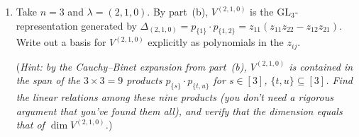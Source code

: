\documentclass[12pt]{article}
\newcommand{\GL}{\mathrm{GL}}
\begin{document}
\begin{enumerate}
\begin{enumerate}
(\emph{Hint: use Cauchy--Binet to show the polynomial $\GL_n$-representation generated by $\Delta_\lambda$ is finite-dimensional, hence completely reducible, and apply Part~6 of the proof sketch of Theorem~57, which you can assume holds equally well for $GL_n$.})

\item Take $n = 3$ and $\lambda = (2,1,0)$. By part~(b), $V^{(2,1,0)}$ is
the $\GL_3$-representation generated by
$\Delta_{(2,1,0)} = p_{\{1\}} \cdot p_{\{1,2\}}= z_{11}(z_{11}z_{22} - z_{12}z_{21})$.
Write out a basis for $V^{(2,1,0)}$ explicitly as polynomials in the $z_{ij}$.

(\emph{Hint: by the Cauchy--Binet expansion from part~(b), $V^{(2,1,0)}$ is
contained in the span of the $3 \times 3 = 9$ products $p_{\{s\}} \cdot
p_{\{t,u\}}$ for $s \in [3]$, $\{t,u\} \subseteq [3]$. Find the linear
relations among these nine products (you don't need a rigorous argument that you've found them all), and verify that the dimension equals that of $\dim V^{(2,1,0)}$.})
\end{enumerate}

\end{enumerate}
\end{document}
